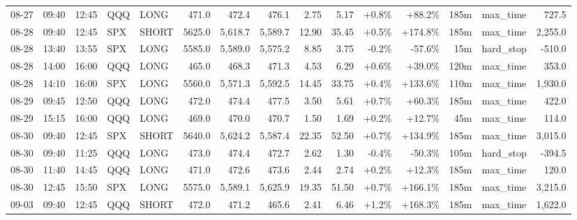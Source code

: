 \documentclass[11pt,a4paper,twoside]{article}
\begin{document}
\begin{landscape}
\begin{center}
\begin{longtable}{>{\color{txtmain}}l l l l l r r r r r r r r >{\color{txtmain}}l r}
08-27 & 09:40 & 12:45 & QQQ & LONG & 471.0 & 472.4 & 476.1 & 2.75 & 5.17 & \textcolor{wingreen}{+0.8\%} & \textcolor{wingreen}{+88.2\%} & 185m & max\_time & \textcolor{wingreen}{727.5} \\
08-28 & 09:40 & 12:45 & SPX & SHORT & 5625.0 & 5,618.7 & 5,589.7 & 12.90 & 35.45 & \textcolor{wingreen}{+0.5\%} & \textcolor{wingreen}{+174.8\%} & 185m & max\_time & \textcolor{wingreen}{2,255.0} \\
08-28 & 13:40 & 13:55 & SPX & LONG & 5585.0 & 5,589.0 & 5,575.2 & 8.85 & 3.75 & \textcolor{lossred}{-0.2\%} & \textcolor{lossred}{-57.6\%} & 15m & hard\_stop & \textcolor{lossred}{-510.0} \\
08-28 & 14:00 & 16:00 & QQQ & LONG & 465.0 & 468.3 & 471.3 & 4.53 & 6.29 & \textcolor{wingreen}{+0.6\%} & \textcolor{wingreen}{+39.0\%} & 120m & max\_time & \textcolor{wingreen}{353.0} \\
08-28 & 14:10 & 16:00 & SPX & LONG & 5560.0 & 5,571.3 & 5,592.5 & 14.45 & 33.75 & \textcolor{wingreen}{+0.4\%} & \textcolor{wingreen}{+133.6\%} & 110m & max\_time & \textcolor{wingreen}{1,930.0} \\
08-29 & 09:45 & 12:50 & QQQ & LONG & 472.0 & 474.4 & 477.5 & 3.50 & 5.61 & \textcolor{wingreen}{+0.7\%} & \textcolor{wingreen}{+60.3\%} & 185m & max\_time & \textcolor{wingreen}{422.0} \\
08-29 & 15:15 & 16:00 & QQQ & LONG & 469.0 & 470.0 & 470.7 & 1.50 & 1.69 & \textcolor{wingreen}{+0.2\%} & \textcolor{wingreen}{+12.7\%} & 45m & max\_time & \textcolor{wingreen}{114.0} \\
08-30 & 09:40 & 12:45 & SPX & SHORT & 5640.0 & 5,624.2 & 5,587.4 & 22.35 & 52.50 & \textcolor{wingreen}{+0.7\%} & \textcolor{wingreen}{+134.9\%} & 185m & max\_time & \textcolor{wingreen}{3,015.0} \\
08-30 & 09:40 & 11:25 & QQQ & LONG & 473.0 & 474.4 & 472.7 & 2.62 & 1.30 & \textcolor{lossred}{-0.4\%} & \textcolor{lossred}{-50.3\%} & 105m & hard\_stop & \textcolor{lossred}{-394.5} \\
08-30 & 11:40 & 14:45 & QQQ & LONG & 471.0 & 472.6 & 473.6 & 2.44 & 2.74 & \textcolor{wingreen}{+0.2\%} & \textcolor{wingreen}{+12.3\%} & 185m & max\_time & \textcolor{wingreen}{120.0} \\
08-30 & 12:45 & 15:50 & SPX & LONG & 5575.0 & 5,589.1 & 5,625.9 & 19.35 & 51.50 & \textcolor{wingreen}{+0.7\%} & \textcolor{wingreen}{+166.1\%} & 185m & max\_time & \textcolor{wingreen}{3,215.0} \\
09-03 & 09:40 & 12:45 & QQQ & SHORT & 472.0 & 471.2 & 465.6 & 2.41 & 6.46 & \textcolor{wingreen}{+1.2\%} & \textcolor{wingreen}{+168.3\%} & 185m & max\_time & \textcolor{wingreen}{1,622.0} \\

\end{longtable}
\end{center}
\end{landscape}
\end{document}
